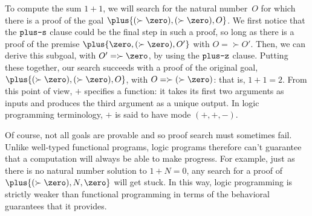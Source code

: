 To compute the sum $1 + 1$, we
will search for the natural number~$O$ for which there is a proof of the goal $\plus{(\succ{\zero}),(\succ{\zero}),O}$.
We first notice that the $\text{\normalfont\ttfamily plus-s}$ clause could be the final step in such a proof, so long as there is a proof of the premise $\plus{\zero,(\succ{\zero}),O'}$ with $O = \succ{O'}$.
Then, we can derive this subgoal, with $O' = \succ{\zero}$, by using the $\text{\normalfont\ttfamily plus-z}$ clause.
Putting these together, our search succeeds with a proof of the original goal, $\plus{(\succ{\zero}),(\succ{\zero}),O}$, with $O = \succ{(\succ{\zero})}$: that is, $1 + 1 = 2$.
From this point of view, $\plus{}$ specifies a function: it takes its first two arguments as inputs and produces the third argument as a unique output.
In logic programming terminology, $\plus{}$ is said to have mode $(+,+,-)$.%

Of course, not all goals are provable and so proof search must sometimes fail.
Unlike well-typed functional programs, logic programs therefore can't guarantee that a computation will always be able to make progress.
For example, just as there is no natural number solution to $1 + N = 0$, any search for a proof of $\plus{(\succ{\zero}),N,\zero}$ will get stuck.
In this way, logic programming is strictly weaker than functional programming in terms of the behavioral guarantees that it provides.





